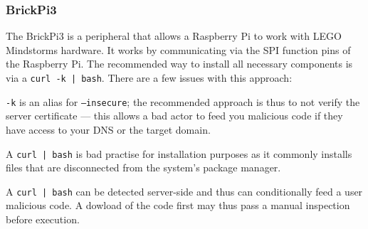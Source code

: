 \subsubsection{BrickPi3}
The BrickPi3 is a peripheral that allows a Raspberry Pi to work with LEGO Mindstorms hardware.
It works by communicating via the SPI function pins of the Raspberry Pi.
The recommended way to install all necessary components is via a \texttt{curl -k | bash}.
There are a few issues with this approach:
\begin{inline-enum}
\item \texttt{-k} is an alias for \texttt{--insecure};
  the recommended approach is thus to not verify the server certificate ---
  this allows a bad actor to feed you malicious code if they have access to your DNS or the target domain.
\item A \texttt{curl | bash} is bad practise for installation purposes as it commonly installs files that are disconnected from the system's package manager.
\item A \texttt{curl | bash} can be detected server-side and thus can conditionally feed a user malicious code.
  A dowload of the code first may thus pass a manual inspection before execution. \parencite{curl-bash}
\end{inline-enum}

